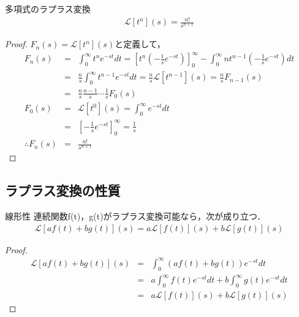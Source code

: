 \begin{exprbox}{多項式のラプラス変換}
    \begin{eqnarray}
        \mathcal{L}[t^n](s) = \frac{n!}{s^{n + 1}}
    \end{eqnarray}
    \begin{proof}
        $F_n(s) = \mathcal{L}[t^n](s)$と定義して，
        \begin{eqnarray*}
            F_n(s) &=& \int_{0}^{\infty} t^n e^{-st} dt
            = \left[t^n \left(-\frac{1}{s} e^{-st}\right)\right]_0^\infty - \int_{0}^{\infty} n t^{n - 1} \left(-\frac{1}{s} e^{-st}\right) dt \\
            &=& \frac{n}{s} \int_{0}^{\infty} t^{n - 1} e^{-st} dt = \frac{n}{s} \mathcal{L}[t^{n - 1}](s)
            = \frac{n}{s} F_{n - 1}(s) \\
            &=& \frac{n}{s} \frac{n - 1}{s} \cdots \frac{1}{s} F_0(s) \\
            F_0(s) &=& \mathcal{L}[t^0](s) = \int_{0}^{\infty} e^{-st} dt \\
            &=& \left[-\frac{1}{s}e^{-st}\right]_0^\infty = \frac{1}{s} \\
            \therefore F_n(s) &=& \frac{n!}{s^{n + 1}}
        \end{eqnarray*}
    \end{proof}
\end{exprbox}

\newpage

\subsection{ラプラス変換の性質}

\begin{exprbox}{線形性}
    連続関数f(t)，g(t)がラプラス変換可能なら，次が成り立つ．
    \begin{eqnarray}
        \mathcal{L}[a f(t) + b g(t)](s) = a\mathcal{L}[f(t)](s) + b\mathcal{L}[g(t)](s)
    \end{eqnarray}
    \begin{proof}
        \begin{eqnarray*}
            \mathcal{L}[a f(t) + b g(t)](s) &=& 
            \int_{0}^{\infty} \left(a f(t) + b g(t)\right) e^{-st} dt\\
            &=& a \int_{0}^{\infty} f(t) e^{-st} dt + b \int_{0}^{\infty} g(t) e^{-st} dt \\
            &=& a\mathcal{L}[f(t)](s) + b\mathcal{L}[g(t)](s)
        \end{eqnarray*}
    \end{proof}
\end{exprbox}

